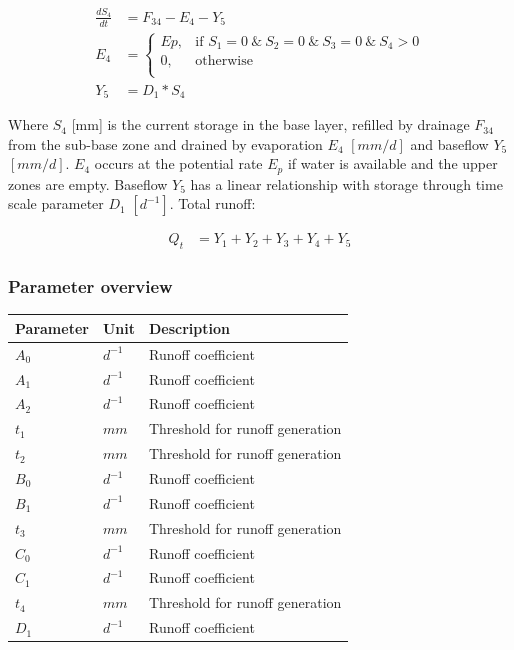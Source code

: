 \begin{align}
	\frac{dS_4}{dt} &= F_{34}-E_4-Y_5\\
	E_4 &= \begin{cases}
		Ep, &\text{if } S_1 = 0 ~\&~ S_2 = 0 ~\&~ S_3 = 0 ~\&~ S_4 > 0\\
		0, & \text{otherwise} \\
	\end{cases} \\
	Y_5 &= D_1*S_4
\end{align}

Where $S_4$ [mm] is the current storage in the base layer, refilled by drainage $F_{34}$ from the sub-base zone and drained by evaporation $E_4$ $[mm/d]$ and baseflow $Y_5$ $[mm/d]$. $E_4$ occurs at the potential rate $E_p$ if water is available and the upper zones are empty. Baseflow $Y_5$ has a linear relationship with storage through time scale parameter $D_1$ $[d^{-1}]$. Total runoff:

\begin{align}
	Q_t &= Y_1+Y_2+Y_3+Y_4+Y_5
\end{align}

\subsubsection{Parameter overview}
\begin{table}[htbp]
  \centering
    \begin{tabular}{lll}
    \toprule
    Parameter & Unit  & Description \\
    \midrule
    $A_0$ & $d^{-1}$ & Runoff coefficient \\
    $A_1$ & $d^{-1}$ & Runoff coefficient \\
    $A_2$ & $d^{-1}$ & Runoff coefficient \\
    $t_1$ & $mm$  & Threshold for runoff generation \\
    $t_2$ & $mm$  & Threshold for runoff generation \\
    $B_0$ & $d^{-1}$ & Runoff coefficient \\
    $B_1$ & $d^{-1}$ & Runoff coefficient \\
    $t_3$ & $mm$  & Threshold for runoff generation \\
    $C_0$ & $d^{-1}$ & Runoff coefficient \\
    $C_1$ & $d^{-1}$ & Runoff coefficient \\
    $t_4$ & $mm$  & Threshold for runoff generation \\
    $D_1$ & $d^{-1}$ & Runoff coefficient \\
    \bottomrule
    \end{tabular}%
  \label{tab:addlabel}%
\end{table}%

